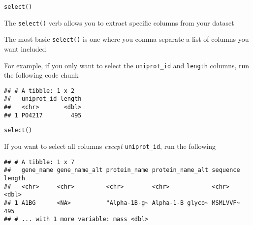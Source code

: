 \documentclass[ignorenonframetext,]{beamer}
\newenvironment{Shaded}{\begin{snugshade}}{\end{snugshade}}
\newcommand{\DecValTok}[1]{\textcolor[rgb]{0.00,0.00,0.81}{#1}}
\newcommand{\KeywordTok}[1]{\textcolor[rgb]{0.13,0.29,0.53}{\textbf{#1}}}
\newcommand{\NormalTok}[1]{#1}
\newcommand{\OperatorTok}[1]{\textcolor[rgb]{0.81,0.36,0.00}{\textbf{#1}}}
\newcommand{\StringTok}[1]{\textcolor[rgb]{0.31,0.60,0.02}{#1}}
\begin{document}
\begin{frame}[fragile]{\texttt{select()}}
\protect\hypertarget{select}{}

The \texttt{select()} verb allows you to extract specific columns from
your dataset

The most basic \texttt{select()} is one where you comma separate a list
of columns you want included

For example, if you only want to select the \texttt{uniprot\_id} and
\texttt{length} columns, run the following code chunk

\begin{Shaded}
\end{Shaded}

\begin{verbatim}
## # A tibble: 1 x 2
##   uniprot_id length
##   <chr>       <dbl>
## 1 P04217        495
\end{verbatim}

\end{frame}

\begin{frame}[fragile]{\texttt{select()}}
\protect\hypertarget{select-1}{}

If you want to select all columns \emph{except} \texttt{uniprot\_id},
run the following

\begin{Shaded}
\end{Shaded}

\begin{verbatim}
## # A tibble: 1 x 7
##   gene_name gene_name_alt protein_name protein_name_alt sequence length
##   <chr>     <chr>         <chr>        <chr>            <chr>     <dbl>
## 1 A1BG      <NA>          "Alpha-1B-g~ Alpha-1-B glyco~ MSMLVVF~    495
## # ... with 1 more variable: mass <dbl>
\end{verbatim}

\end{frame}
\end{document}
